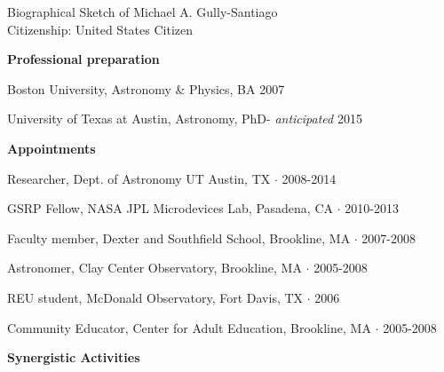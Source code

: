 \documentclass[12pt,letterpaper]{article}
\newcommand{\namestyle}{\Large}
\begin{document}
    \namestyle Biographical Sketch of Michael A. Gully-Santiago \\[0.3em]
     \normalsize Citizenship: United States Citizen

\normalsize

\begin{center}
 \large \textbf{Professional preparation}
\end{center}
\normalsize

Boston University, Astronomy \& Physics, BA 2007

University of Texas at Austin, Astronomy, PhD- \emph{anticipated} 2015

\begin{center}
 \large \textbf{Appointments}
\end{center}
\normalsize

Researcher, Dept. of Astronomy UT Austin, TX $\cdot$ 2008-2014

GSRP Fellow, NASA JPL Microdevices Lab, Pasadena, CA $\cdot$ 2010-2013

Faculty member, Dexter and Southfield School, Brookline, MA $\cdot$ 2007-2008

Astronomer, Clay Center Observatory, Brookline, MA $\cdot$ 2005-2008

REU student, McDonald Observatory, Fort Davis, TX $\cdot$ 2006

Community Educator, Center for Adult Education, Brookline, MA $\cdot$ 2005-2008


\small



\normalsize

\begin{center}
 \large \textbf{Synergistic Activities}
\end{center}
\normalsize
\end{document}
